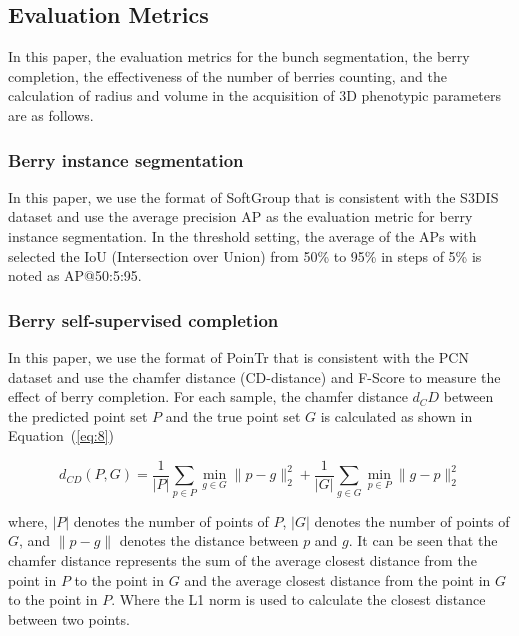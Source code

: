\documentclass[12pt]{article}
\begin{document}
\subsection{Evaluation Metrics}

In this paper, the evaluation metrics for the bunch segmentation, the berry completion, the effectiveness of the number of berries counting, and the calculation of radius and volume in the acquisition of 3D phenotypic parameters are as follows.

\subsubsection{Berry instance segmentation}
\label{sec:251}
In this paper, we use the format of SoftGroup \citep{vu_softgroup_2022} that is consistent with the S3DIS dataset \citep{armeni_3d_2016} and use the average precision AP \citep{vu_softgroup_2022} as the evaluation metric for berry instance segmentation. In the threshold setting, the average of the APs with selected the IoU (Intersection over Union) from 50\% to 95\% in steps of 5\% is noted as AP@50:5:95.

\subsubsection{Berry self-supervised completion}

In this paper, we use the format of PoinTr \citep{yu_pointr_2021} that is consistent with the PCN dataset \citep{yuan_pcn_2018} and use the chamfer distance (CD-distance) and F-Score to measure the effect of berry completion. 
For each sample, the chamfer distance $d_CD$ between the predicted point set $P$ and the true point set $G$ is calculated as shown in Equation~(\ref{eq:8})

\begin{equation}
    d_{CD}(P, G) = \frac{1}{|P|} \sum_{p \in P} \min_{g \in G} \|p - g\|_2^2 + \frac{1}{|G|} \sum_{g \in G} \min_{p \in P} \|g - p\|_2^2
    \label{eq:8}
\end{equation}

{\raggedright where, $|P|$ denotes the number of points of $P$, $|G|$ denotes the number of points of $G$, and $\|p - g\|$ denotes the distance between $p$ and $g$. 
It can be seen that the chamfer distance represents the sum of the average closest distance from the point in $P$ to the point in $G$ and the average closest distance from the point in $G$ to the point in $P$. Where the L1 norm is used to calculate the closest distance between two points.}
\end{document}
